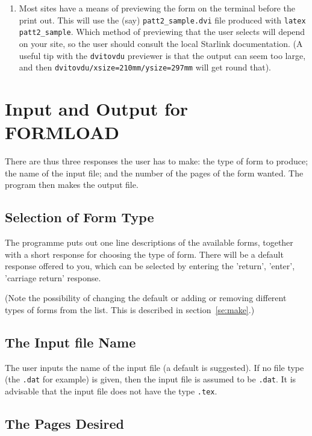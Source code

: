 \begin{enumerate}
\item Most sites have a means of previewing the form on the terminal
before the print out. This will use the (say) {\tt patt2\_sample.dvi}
file produced with {\tt latex patt2\_sample}. Which method of previewing
that the user selects will depend on your site, so the user should
consult the local Starlink documentation. (A useful tip with the
{\tt dvitovdu} previewer is that the output can seem too large, and then
{\tt dvitovdu/xsize=210mm/ysize=297mm} will get round that).

\end{enumerate}

\section{Input and Output for FORMLOAD }

There are thus three responses the user has to make: the type of form to
produce; the name of the input file; and the number of the pages of the
form wanted. The program then makes the output file.

\subsection{Selection of Form Type}

The programme puts out one line descriptions of the available forms, together
with a short response for choosing the type of form. There will be a
default response offered to you, which can be selected by entering the
'return', 'enter', 'carriage return' response.

(Note the possibility of changing the default or adding or removing
different types of forms from the list. This is described in
section~\ref{se:make}.)

\subsection{The Input file Name}

The user inputs the name of the input file (a default is suggested). If no
file type (the {\tt .dat} for example) is given, then the input file is
assumed to be {\tt .dat}. It is advisable that the input file does not have
the type {\tt .tex}.

\subsection{The Pages Desired}

